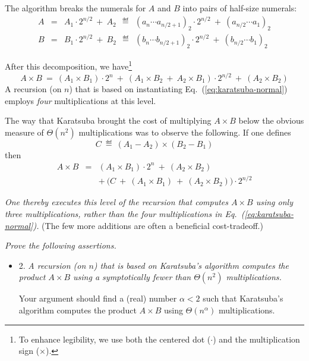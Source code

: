 \begin{itemize}
\smallskip

The algorithm breaks the numerals for $A$ and $B$ into pairs of half-size numerals:
\begin{eqnarray*}
A & = & A_1 \cdot 2^{n/2} \ + \ A_2 \ \ 
 \eqdef  \ \ (a_n \cdots a_{n/2+1})_2 \cdot 2^{n/2} \ + \ (a_{n/2} \cdots a_1)_2 \\
B & = & B_1 \cdot 2^{n/2} \ + \  B_2 \ \
  \eqdef  \ \ (b_n \cdots b_{n/2+1})_2 \cdot 2^{n/2} \ + \ (b_{n/2} \cdots b_1)_2
\end{eqnarray*}

After this decomposition, we have\footnote{To enhance legibility, we use both the centered dot ($\cdot$) and the multiplication sign ($\times$).}
\begin{equation}
\label{eq:karatsuba-normal}
A \times B \ = \ (A_1 \times B_1) \cdot 2^n \ + \  (A_1 \times B_2 \ + \ A_2 \times B_1) \cdot 2^{n/2} \ + \ (A_2 \times B_2)
\end{equation}
A recursion (on $n$) that is based on instantiating Eq.~(\ref{eq:karatsuba-normal}) employs {\em four} multiplications at this level.

\smallskip

The way that Karatsuba brought the cost of multiplying $A \times B$ below the obvious measure of $\Theta(n^2)$ multiplications was to observe the following.  If one defines
\[ C \ \eqdef \ (A_1 - A_2) \times (B_2 - B_1) \]
then
\begin{eqnarray*}
A \times B & = & (A_1 \times B_1) \cdot 2^n \ + \ (A_2 \times B_2) \\
                 &    & + \ \big(C \ + \ (A_1 \times B_1) \ + \ (A_2 \times B_2) \big) \cdot 2^{n/2}
\end{eqnarray*}

{\em One thereby executes this level of the recursion that computes $A \times B$ using only {\em three} multiplications, rather than the four multiplications in Eq.~(\ref{eq:karatsuba-normal}).}  (The few more additions are often a beneficial cost-tradeoff.)

\medskip

{\em Prove the following assertions.}
\begin{itemize}
\item 2.
{\em A recursion (on $n$) that is based on Karatsuba's algorithm computes the product $A \times B$ using a {\em symptotically fewer than} $\Theta(n^2)$ multiplications.}
\smallskip

Your argument should find a (real) number $\alpha < 2$ such that Karatsuba's algorithm computes the product $A \times B$ using $\Theta(n^\alpha)$ multiplications.
\end{itemize}


\end{itemize}
